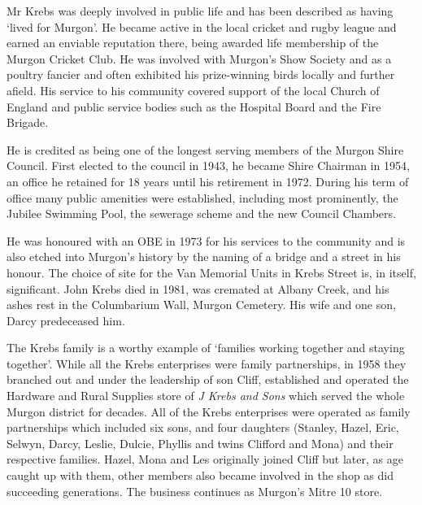 Mr Krebs was deeply involved in public life and has been described as having `lived for Murgon'. He became active in the local cricket and rugby league and earned an enviable reputation there, being awarded life membership of the Murgon Cricket Club. He was involved with Murgon's Show Society and as a poultry fancier and often exhibited his prize-winning birds locally and further afield. His service to his community covered support of the local Church of England and public service bodies such as the Hospital Board and the Fire Brigade.



He is credited as being one of the longest serving members of the Murgon Shire Council. First elected to the council in 1943, he became Shire Chairman in 1954, an office he retained for 18 years until his retirement in 1972. During his term of office many public amenities were established, including most prominently, the Jubilee Swimming Pool, the sewerage scheme and the new Council Chambers.



He was honoured with an OBE in 1973 for his services to the community and is also etched into Murgon's history by the naming of a bridge and a street in his honour. The choice of site for the Van Memorial Units in Krebs Street is, in itself, significant. John Krebs died in 1981, was cremated at Albany Creek, and his ashes rest in the Columbarium Wall, Murgon Cemetery. His wife and one son, Darcy predeceased him.



The Krebs family is a worthy example of `families working together and staying together'. While all the Krebs enterprises were family partnerships, in 1958 they branched out and under the leadership of son Cliff, established and operated the Hardware and Rural Supplies store of \emph{J Krebs and Sons} which served the whole Murgon district for decades. All of the Krebs enterprises were operated as family partnerships which included six sons, and four daughters (Stanley, Hazel, Eric, Selwyn, Darcy, Leslie, Dulcie, Phyllis and twins Clifford and Mona) and their respective families. Hazel, Mona and Les originally joined Cliff but later, as age caught up with them, other members also became involved in the shop as did succeeding generations. The business continues as Murgon's Mitre 10 store.









